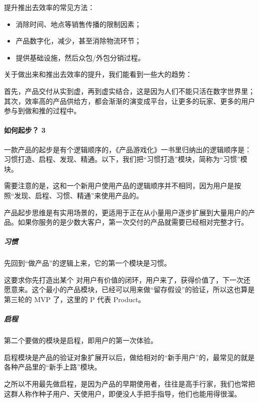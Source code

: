 \documentclass[letterpaper,11pt,english]{sphinxmanual}
\begin{document}
提升推出去效率的常见方法：
\begin{itemize}
\item {} 
消除时间、地点等销售传播的限制因素；

\item {} 
产品数字化，减少，甚至消除物流环节；

\item {} 
提供基础设施，然后众包/外包分销过程。

\end{itemize}

关于做出来和推出去效率的提升，我们能看到一些大的趋势：

首先，产品交付从实到虚，再到虚实结合，这是因为人们不能只活在数字世界里；
其次，效率高的产品供给方，都会渐渐的演变成平台，让更多的玩家、更多的用户参与到做和推的过程中。


\paragraph{如何起步？ 3\sphinxfootnotemark[6]}
\label{\detokenize{chapter_introduction/Product:id20}}%
\begin{footnotetext}[6]\sphinxAtStartFootnote
{}
%
\end{footnotetext}\ignorespaces 
一款产品的起步是有个逻辑顺序的，《产品游戏化》一书里归纳出的逻辑顺序是：习惯打造、启程、发现、精通。以下，我们把“习惯打造”模块，简称为“习惯”模块。

需要注意的是，这和一个新用户使用产品的逻辑顺序并不相同，因为用户是按照“发现、启程、习惯、精通”来使用产品的。

产品起步思维是有实用场景的，更适用于正在从小量用户逐步扩展到大量用户的产品。如果你服务的是少数大客户，第一次交付的产品就需要已经相对完整才行。


\subparagraph{习惯}
\label{\detokenize{chapter_introduction/Product:id21}}
先回到“做产品”的逻辑上来，它的第一个模块是习惯。

这要求你先打造出某个
对用户有价值的闭环，用户来了，获得价值了，下一次还愿意来。这个最小的产品模块，已经可以用来做“留存假设”的验证，所以这也算是第三轮的
MVP 了，这里的 P 代表 Product。


\subparagraph{启程}
\label{\detokenize{chapter_introduction/Product:id22}}
第二个要做的模块是启程，即用户的第一次体验。

启程模块是产品的验证对象扩展开以后，做给相对的“新手用户”的，最常见的就是各种产品里的“新手上路”模块。

之所以不用最先做启程，是因为产品的早期使用者，往往是高手行家，我们也常把这群人称作种子用户、天使用户，即便没人手把手指导，他们也能用得很溜。
\end{document}
